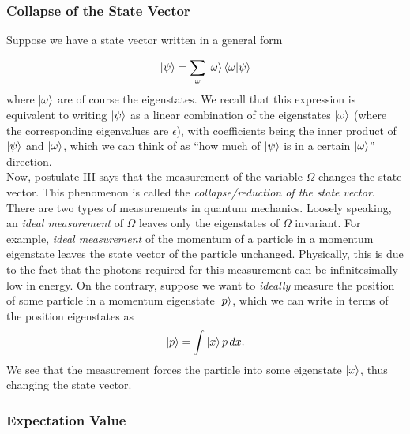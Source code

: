 \documentclass{book}
\theoremstyle{definition}
\begin{document}
\subsubsection{Collapse of the State Vector}
Suppose we have a state vector written in a general form

\begin{align}
\ket{\psi} = \sum_\omega \ket{\omega}\bra{\omega}\ket{\psi}
\end{align}
where $\ket{\omega}$ are of course the eigenstates. We recall that this expression is equivalent to writing $\ket{\psi}$ as a linear combination of the eigenstates $\ket{\omega}$ (where the corresponding eigenvalues are $\epsilon$), with coefficients being the inner product of $\ket{\psi}$ and $\ket{\omega}$, which we can think of as ``how much of $\ket{\psi}$ is in a certain $\ket{\omega}$'' direction. \\

Now, postulate III says that the measurement of the variable $\Omega$ changes the state vector. This phenomenon is called the \textit{collapse/reduction of the state vector}. There are two types of measurements in quantum mechanics. Loosely speaking, an \textit{ideal measurement} of $\Omega$ leaves only the eigenstates of $\Omega$ invariant. For example, \textit{ideal measurement} of the momentum of a particle in a momentum eigenstate leaves the state vector of the particle unchanged. Physically, this is due to the fact that the photons required for this measurement can be infinitesimally low in energy. On the contrary, suppose we want to \textit{ideally} measure the position of some particle in a momentum eigenstate $\ket{p}$, which we can write in terms of the position eigenstates as
\begin{align}
\ket{p} =\int \ket{x} {p}\,dx.
\end{align}
We see that the measurement forces the particle into some eigenstate $\ket{x}$, thus changing the state vector. 



\subsubsection{Expectation Value}
\end{document}
